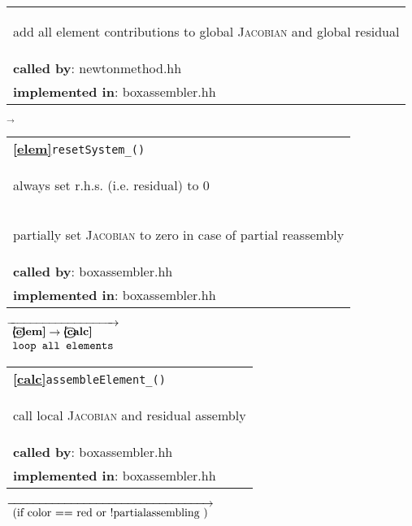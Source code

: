 \begin{landscape}
{\begin{tabular}{|l|}
    \begin{scriptsize}add all element contributions to global \textsc{Jacobian} and global residual\end{scriptsize}\\
      \textbf{called by}: newtonmethod.hh\\
      \textbf{implemented in}: boxassembler.hh\\  
	\hline
  \end{tabular}
    \nextline
    $\overrightarrow{
    }$
    \begin{tabular}{|l|}
      \hline      
	\textbf{\textcircled{\ref{elem}}}\verb+resetSystem_()+ \\
    \begin{scriptsize}always set r.h.s. (i.e. residual) to 0\end{scriptsize}\\
    \begin{scriptsize}partially set \textsc{Jacobian} to zero in case of partial reassembly\end{scriptsize}\\
      \textbf{called by}: boxassembler.hh\\
      \textbf{implemented in}: boxassembler.hh\\  
	\hline
  \end{tabular}
    {\scriptsize$\overrightarrow{\begin{array}{l}
				  \textbf{\textcircled{\ref{elem}}}\rightarrow\textbf{\textcircled{\ref{calc}}}\\
				  \texttt{loop all elements}
                                \end{array}
    }$}
     \begin{tabular}{|l|}
      \hline
      \textbf{\textcircled{\ref{calc}}}\verb+assembleElement_()+ \\
      \begin{scriptsize}call local \textsc{Jacobian} and residual assembly\end{scriptsize}\\
      \textbf{called by}: boxassembler.hh\\
      \textbf{implemented in}: boxassembler.hh\\  
      \hline
     \end{tabular}
\nextline
    {\scriptsize$\overrightarrow{
    \begin{array}{l}
    \textnormal{(if color == red or !partialassembling )}
    \end{array}
    }$}
     \begin{tabular}{|l|}

\end{tabular}}
\end{landscape}
